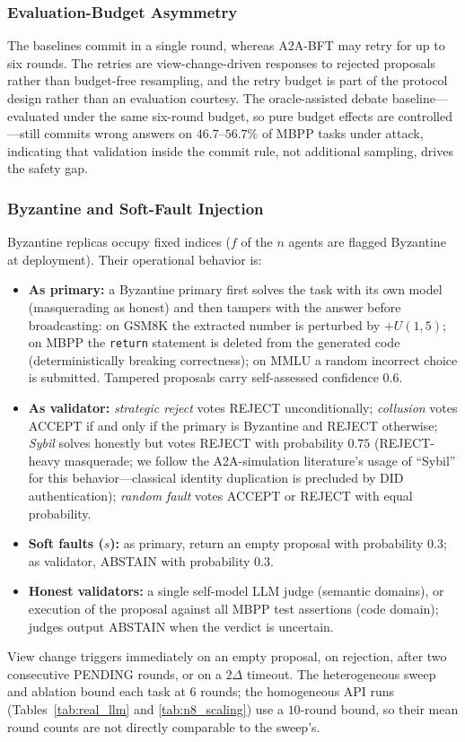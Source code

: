 \documentclass{article}
\begin{document}
\subsubsection{Evaluation-Budget Asymmetry}
The baselines commit in a single round, whereas A2A-BFT may retry for up to six rounds. The retries are view-change-driven responses to rejected proposals rather than budget-free resampling, and the retry budget is part of the protocol design rather than an evaluation courtesy. The oracle-assisted debate baseline---evaluated under the same six-round budget, so pure budget effects are controlled---still commits wrong answers on $46.7$--$56.7\%$ of MBPP tasks under attack, indicating that validation inside the commit rule, not additional sampling, drives the safety gap.

\subsubsection{Byzantine and Soft-Fault Injection}
Byzantine replicas occupy fixed indices ($f$ of the $n$ agents are flagged Byzantine at deployment). Their operational behavior is:
\begin{itemize}
    \item \textbf{As primary:} a Byzantine primary first solves the task with its own model (masquerading as honest) and then tampers with the answer before broadcasting: on GSM8K the extracted number is perturbed by $+U(1,5)$; on MBPP the \texttt{return} statement is deleted from the generated code (deterministically breaking correctness); on MMLU a random incorrect choice is submitted. Tampered proposals carry self-assessed confidence $0.6$.
    \item \textbf{As validator:} \emph{strategic reject} votes REJECT unconditionally; \emph{collusion} votes ACCEPT if and only if the primary is Byzantine and REJECT otherwise; \emph{Sybil} solves honestly but votes REJECT with probability $0.75$ (REJECT-heavy masquerade; we follow the A2A-simulation literature's usage of ``Sybil'' for this behavior---classical identity duplication is precluded by DID authentication); \emph{random fault} votes ACCEPT or REJECT with equal probability.
    \item \textbf{Soft faults ($s$):} as primary, return an empty proposal with probability $0.3$; as validator, ABSTAIN with probability $0.3$.
    \item \textbf{Honest validators:} a single self-model LLM judge (semantic domains), or execution of the proposal against all MBPP test assertions (code domain); judges output ABSTAIN when the verdict is uncertain.
\end{itemize}
View change triggers immediately on an empty proposal, on rejection, after two consecutive PENDING rounds, or on a $2\Delta$ timeout. The heterogeneous sweep and ablation bound each task at $6$ rounds; the homogeneous API runs (Tables~\ref{tab:real_llm} and \ref{tab:n8_scaling}) use a $10$-round bound, so their mean round counts are not directly comparable to the sweep's.
\end{document}
